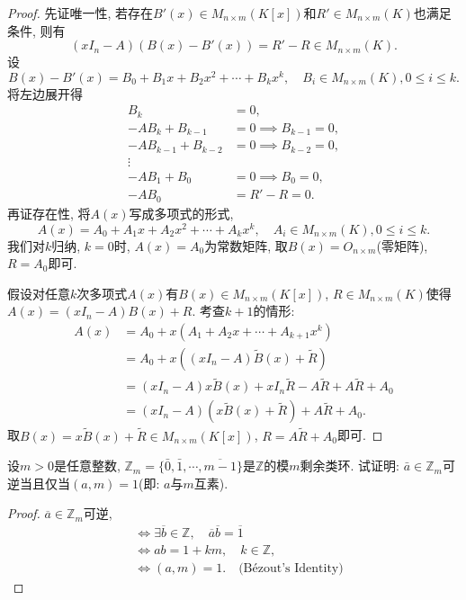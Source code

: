 \begin{proof}
    先证唯一性, 若存在$B'(x) \in M_{n \times m}(K[x])$和$R' \in M_{n \times m}(K)$也满足条件, 则有
    \[
        (xI_n - A)(B(x) - B'(x)) = R' - R \in M_{n \times m}(K).
    \]
    设
    \[
        B(x) - B'(x) = B_0 + B_1x + B_2x^2 + \cdots + B_kx^k, \quad B_i \in M_{n \times m}(K), 0 \leqslant i \leqslant k.
    \]
    将左边展开得
    \[
    \begin{aligned}
        B_k &= 0,\\
        -AB_k + B_{k - 1} &= 0 \implies B_{k - 1} = 0,\\
        -AB_{k - 1} + B_{k - 2} &= 0 \implies B_{k - 2} = 0,\\
        \vdots\\
        -AB_1 + B_0 &= 0 \implies B_0 = 0,\\
        -AB_0 &= R' - R = 0.
    \end{aligned}
    \]
    再证存在性, 将$A(x)$写成多项式的形式,
    \[
        A(x) = A_0 + A_1x + A_2x^2 + \cdots + A_kx^k, \quad A_i \in M_{n \times m}(K), 0 \leqslant i \leqslant k.
    \]
    我们对$k$归纳, $k = 0$时, $A(x) = A_0$为常数矩阵, 取$B(x) = O_{n \times m}$(零矩阵), $R = A_0$即可.
    
    假设对任意$k$次多项式$A(x)$有$B(x) \in M_{n \times m}(K[x])$, $R \in M_{n \times m}(K)$使得$A(x) = (xI_n - A)B(x) + R$. 考查$k + 1$的情形:
    \[
    \begin{aligned}
        A(x) &= A_0 + x(A_1 + A_2x + \cdots + A_{k + 1}x^k)\\
        &= A_0 + x((xI_n - A)\tilde{B}(x) + \tilde{R})\\
        &= (xI_n - A)x\tilde{B}(x) + xI_n\tilde{R} - A\tilde{R} + A\tilde{R}+ A_0\\
        &= (xI_n - A)(x\tilde{B}(x) + \tilde{R}) + A\tilde{R} + A_0.
    \end{aligned}
    \]
    取$B(x) = x\tilde{B}(x) + \tilde{R} \in M_{n \times m}(K[x])$, $R = A\tilde{R} + A_0$即可.
\end{proof}

\begin{problem}
    设$m > 0$是任意整数, $\mathbb{Z}_m = \{\bar{0}, \bar{1}, \cdots, \overline{m-1}\}$是$\mathbb{Z}$的模$m$剩余类环. 试证明: $\bar{a} \in \mathbb{Z}_m$可逆当且仅当$(a, m) = 1$(即: $a$与$m$互素).
\end{problem}

\begin{proof}
    $\overline{a} \in \mathbb{Z}_m$可逆,
    \[
    \begin{aligned}
        &\iff \exists \overline{b} \in \mathbb{Z}, \quad \overline{a}\overline{b} = \overline{1}\\
        &\iff ab = 1 + km, \quad k \in \mathbb{Z},\\
        &\iff (a, m) = 1. \quad \text{(Bézout's Identity)}
    \end{aligned}
    \]
\end{proof}


